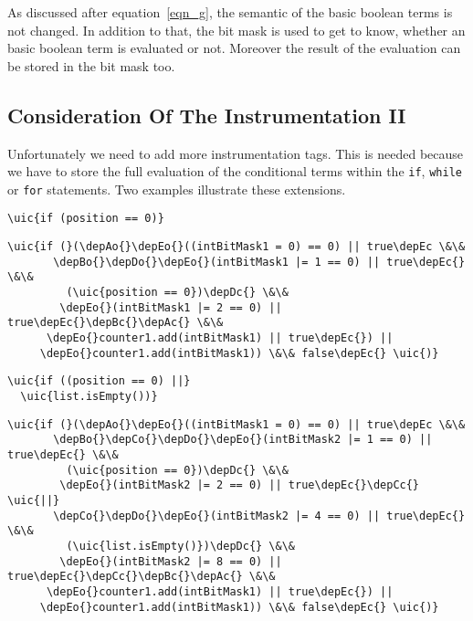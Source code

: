 As discussed after equation~\eqref{eqn_g}, the semantic of the basic boolean terms is not changed. In addition to that, the bit mask is used to get to know, whether an basic boolean term is evaluated or not. Moreover the result of the evaluation can be stored in the bit mask too.

\subsection{Consideration Of The Instrumentation II}
Unfortunately we need to add more instrumentation tags. This is needed because we have to store the full evaluation of the conditional terms within the \texttt{if}, \texttt{while} or \texttt{for} statements. Two examples illustrate these extensions.

\begin{minipage}[t]{0.35\textwidth}
\begin{Verbatim}[commandchars=\\\{\}]
\uic{if (position == 0)}
\end{Verbatim}
\end{minipage}
\begin{minipage}[t]{0.65\textwidth}
\begin{Verbatim}[commandchars=\\\{\}]
\uic{if (}(\depAo{}\depEo{}((intBitMask1 = 0) == 0) || true\depEc \&\&
       \depBo{}\depDo{}\depEo{}(intBitMask1 |= 1 == 0) || true\depEc{} \&\&
         (\uic{position == 0})\depDc{} \&\&
        \depEo{}(intBitMask1 |= 2 == 0) || true\depEc{}\depBc{}\depAc{} \&\&
      \depEo{}counter1.add(intBitMask1) || true\depEc{}) ||
     \depEo{}counter1.add(intBitMask1)) \&\& false\depEc{} \uic{)}
\end{Verbatim}
\end{minipage}
\newline
\newline

\begin{minipage}[t]{0.35\textwidth}
\begin{Verbatim}[commandchars=\\\{\}]
\uic{if ((position == 0) ||}
  \uic{list.isEmpty())}
\end{Verbatim}
\end{minipage}
\begin{minipage}[t]{0.65\textwidth}
\begin{Verbatim}[commandchars=\\\{\}]
\uic{if (}(\depAo{}\depEo{}((intBitMask1 = 0) == 0) || true\depEc \&\&
       \depBo{}\depCo{}\depDo{}\depEo{}(intBitMask2 |= 1 == 0) || true\depEc{} \&\&
         (\uic{position == 0})\depDc{} \&\&
        \depEo{}(intBitMask2 |= 2 == 0) || true\depEc{}\depCc{} \uic{||}
       \depCo{}\depDo{}\depEo{}(intBitMask2 |= 4 == 0) || true\depEc{} \&\&
         (\uic{list.isEmpty()})\depDc{} \&\&
        \depEo{}(intBitMask2 |= 8 == 0) || true\depEc{}\depCc{}\depBc{}\depAc{} \&\&
      \depEo{}counter1.add(intBitMask1) || true\depEc{}) ||
     \depEo{}counter1.add(intBitMask1)) \&\& false\depEc{} \uic{)}
\end{Verbatim}
\end{minipage}
\newline
\newline

